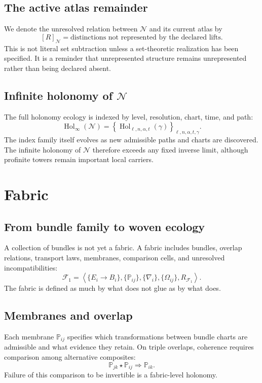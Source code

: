 \documentclass[12pt,openany]{book}
\theoremstyle{remark}
\DeclareMathOperator{\Hol}{Hol}
\newcommand{\Nfabric}{\mathcal N}
\newcommand{\Remainder}{[R]}
\newcommand{\Fabric}{\mathcal F}
\newcommand{\typedtuple}[1]{\left\langle #1 \right\rangle}
\begin{document}
\section{The active atlas remainder}
We denote the unresolved relation between $\Nfabric$ and its current atlas by
\[
\Remainder_{\Nfabric}
=
\text{distinctions not represented by the declared lifts}.
\]
This is not literal set subtraction unless a set-theoretic realization has been specified. It is a reminder that unrepresented structure remains unrepresented rather than being declared absent.

\section{Infinite holonomy of $\Nfabric$}
The full holonomy ecology is indexed by level, resolution, chart, time, and path:
\[
\Hol_\infty(\Nfabric)
=
\left\{
\Hol_{\ell,n,\alpha,t}(\gamma)
\right\}_{\ell,n,\alpha,t,\gamma}.
\]
The index family itself evolves as new admissible paths and charts are discovered. The infinite holonomy of $\Nfabric$ therefore exceeds any fixed inverse limit, although profinite towers remain important local carriers.

\chapter{Fabric}
\label{ch:fabric}

\section{From bundle family to woven ecology}
A collection of bundles is not yet a fabric. A fabric includes bundles, overlap relations, transport laws, membranes, comparison cells, and unresolved incompatibilities:
\[
\Fabric_1
=
\typedtuple{
\{E_i\to B_i\},
\{\mathbb P_{ij}\},
\{\nabla_i\},
\{\Omega_{ij}\},
R_{\Fabric_1}
}.
\]
The fabric is defined as much by what does not glue as by what does.

\section{Membranes and overlap}
Each membrane $\mathbb P_{ij}$ specifies which transformations between bundle charts are admissible and what evidence they retain. On triple overlaps, coherence requires comparison among alternative composites:
\[
\mathbb P_{jk}\star\mathbb P_{ij}
\Longrightarrow
\mathbb P_{ik}.
\]
Failure of this comparison to be invertible is a fabric-level holonomy.
\end{document}
